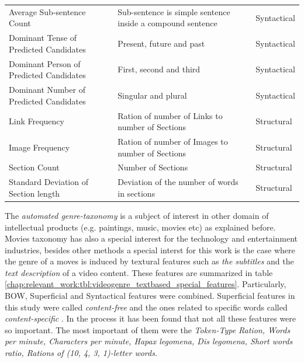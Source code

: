 \begin{table}[t]
\begin{tabular}{p{4cm}p{7cm}p{3cm}}
        Average Sub-sentence Count & Sub-sentence is simple sentence inside a compound sentence & Syntactical \\
        Dominant Tense of  Predicted Candidates & Present, future and past & Syntactical \\
        Dominant Person of  Predicted Candidates & First, second and third & Syntactical \\
        Dominant Number of  Predicted Candidates & Singular and plural & Syntactical \\
		Link Frequency & Ration of number of Links to number of Sections  & Structural \\
        Image Frequency & Ration of number of Images to number of Sections  & Structural \\
        Section Count & Number of Sections & Structural \\
        Standard Deviation of Section length & Deviation of the number of words in sections & Structural \\
		\hline
	\end{tabular}
\end{table}

The \textit{automated genre-taxonomy} is a subject of interest in other domain of intellectual products (e.g. paintings, music, movies etc) as explained before. Movies taxonomy has also a special interest for the technology and entertainment industries, besides other methods a special interst for this work is the case where the genre of a moves is induced by textural features such as \textit{the subtitles} and the \textit{text description} of a video content. These features are summarized in table \ref{chap:relevant_work:tbl:videogenre_textbased_special_features}. Particularly, BOW, Superficial and Syntactical features were combined. Superficial features in this study were called \textit{content-free} and the ones related to specific words called \textit{content-specific} \parencite{lee2017text}. In the process it has been found that not all these features were so important. The most important of them were the \textit{Token-Type Ration, Words per minute, Characters per minute, Hapax legomena, Dis legomena, Short words ratio, Rations of  (10, 4, 3, 1)-letter words}. 


